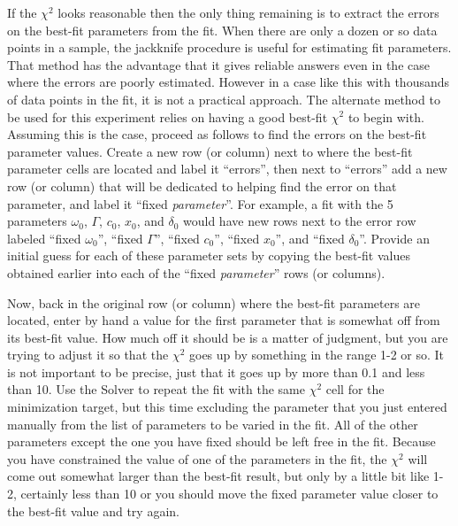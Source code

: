 \documentclass{revtex4}
\begin{document}
If the $\chi^2$ looks reasonable then the only thing remaining is to
extract the errors on the best-fit parameters from the fit.  When there
are only a dozen or so data points in a sample, the jackknife procedure is
useful for estimating fit parameters.  That method has the advantage that
it gives reliable answers even in the case where the errors are poorly
estimated.  However in a case like this with thousands of data points in the
fit, it is not a practical approach.  The alternate method to be used for
this experiment relies on having a good best-fit $\chi^2$ to begin with.
Assuming this is the case, proceed as follows to find the errors on the
best-fit parameter values.  Create a new row (or column) next to where
the best-fit parameter cells are located and label it ``errors'', then
next to ``errors'' add a new row (or column) that will be dedicated to
helping find the error on that parameter, and label it
``fixed {\em parameter}''.  For example, a fit with the 5 parameters 
$\omega_0$, $\Gamma$, $c_0$, $x_0$, and $\delta_0$ would have new rows
next to the error row labeled ``fixed $\omega_0$'', ``fixed $\Gamma$'',
``fixed $c_0$'', ``fixed $x_0$'', and ``fixed $\delta_0$''.  Provide an
initial guess for each of these parameter sets by copying the best-fit
values obtained earlier into each of the ``fixed {\em parameter}'' rows
(or columns).

Now, back in the original row (or column) where the best-fit
parameters are located, enter by hand a value for the first parameter that
is somewhat off from its best-fit value.  How much off it should
be is a matter of judgment, but you are trying to adjust it so that the
$\chi^2$ goes up by something in the range 1-2 or so.  It is not important
to be precise, just that it goes up by more than 0.1 and less than 10.
Use the Solver to repeat the fit with the same $\chi^2$ cell for the
minimization target, but this time excluding the parameter that you just
entered manually from the list of parameters to be varied in the fit.  All
of the other parameters except the one you have fixed should be left free in
the fit.  Because you have constrained the value of one of the parameters in
the fit, the $\chi^2$ will come out somewhat larger than the best-fit result,
but only by a little bit like 1-2, certainly less than 10 or you should move
the fixed parameter value closer to the best-fit value and try again.
\end{document}
